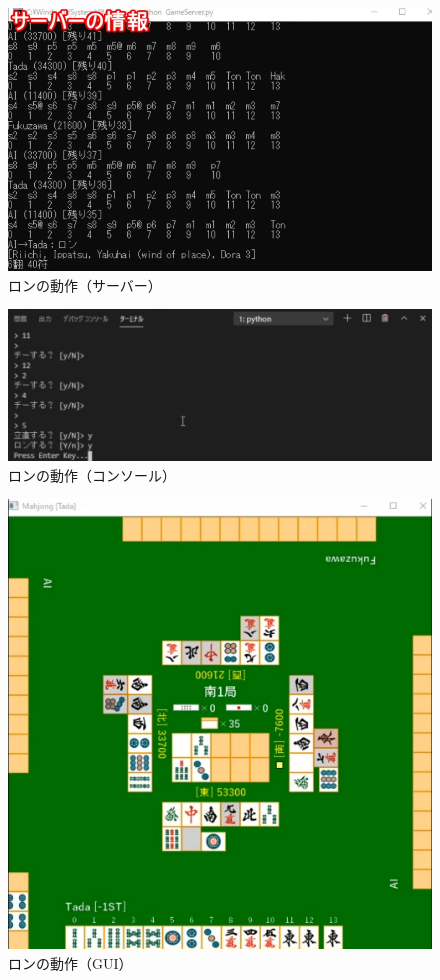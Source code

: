 \documentclass[a4j,titlepage]{jsarticle}
\begin{document}
\begin{figure}[htbp]
  \centering
  \includegraphics[width = 0.8\linewidth]{images/ron_server.png}
  \caption{ロンの動作（サーバー）}
  \label{fig:ron_server}
\end{figure}

\begin{figure}[htbp]
  \centering
  \includegraphics[width = 0.8\linewidth]{images/ron_console.png}
  \caption{ロンの動作（コンソール）}
  \label{fig:ron_console}
\end{figure}

\begin{figure}[htbp]
  \centering
  \includegraphics[width = 0.8\linewidth]{images/ron_gui.png}
  \caption{ロンの動作（GUI）}
  \label{fig:ron_gui}
\end{figure}
\end{document}
